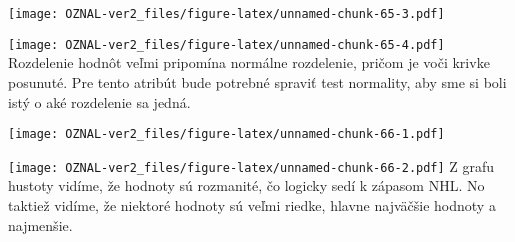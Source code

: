 \documentclass[
]{article}
\newenvironment{Shaded}{\begin{snugshade}}{\end{snugshade}}
\newcommand{\AttributeTok}[1]{\textcolor[rgb]{0.77,0.63,0.00}{#1}}
\newcommand{\ConstantTok}[1]{\textcolor[rgb]{0.00,0.00,0.00}{#1}}
\newcommand{\DecValTok}[1]{\textcolor[rgb]{0.00,0.00,0.81}{#1}}
\newcommand{\FloatTok}[1]{\textcolor[rgb]{0.00,0.00,0.81}{#1}}
\newcommand{\FunctionTok}[1]{\textcolor[rgb]{0.00,0.00,0.00}{#1}}
\newcommand{\NormalTok}[1]{#1}
\newcommand{\SpecialCharTok}[1]{\textcolor[rgb]{0.00,0.00,0.00}{#1}}
\newcommand{\StringTok}[1]{\textcolor[rgb]{0.31,0.60,0.02}{#1}}
\begin{document}
\texttt{[image: OZNAL-ver2\_files/figure-latex/unnamed-chunk-65-3.pdf]}

\begin{Shaded}
\end{Shaded}

\texttt{[image: OZNAL-ver2\_files/figure-latex/unnamed-chunk-65-4.pdf]}
Rozdelenie hodnôt veľmi pripomína normálne rozdelenie, pričom je voči
krivke posunuté. Pre tento atribút bude potrebné spraviť test normality,
aby sme si boli istý o aké rozdelenie sa jedná.

\begin{Shaded}
\end{Shaded}

\texttt{[image: OZNAL-ver2\_files/figure-latex/unnamed-chunk-66-1.pdf]}

\begin{Shaded}
\end{Shaded}

\texttt{[image: OZNAL-ver2\_files/figure-latex/unnamed-chunk-66-2.pdf]} Z
grafu hustoty vidíme, že hodnoty sú rozmanité, čo logicky sedí k zápasom
NHL. No taktiež vidíme, že niektoré hodnoty sú veľmi riedke, hlavne
najväčšie hodnoty a najmenšie.
\end{document}
